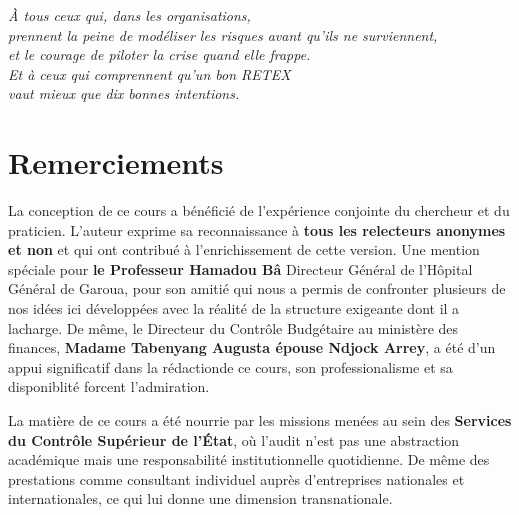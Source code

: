 \documentclass[12pt, a4paper, twoside, openright]{book}
\begin{document}
\clearpage\thispagestyle{empty}
\vspace*{3cm}
\begin{flushright}
    \begin{minipage}{0.62\textwidth}
        \itshape\large\color{CouleurPrimaire}
        À tous ceux qui, dans les organisations,\\
        prennent la peine de modéliser les risques avant qu'ils ne surviennent,\\
        et le courage de piloter la crise quand elle frappe.\\[1.5ex]
        \normalsize\normalfont\color{CouleurAccent}
        Et à ceux qui comprennent qu'un bon RETEX\\
        vaut mieux que dix bonnes intentions.
    \end{minipage}
\end{flushright}

\clearpage\thispagestyle{empty}
\chapter*{Remerciements}

La conception de ce cours a bénéficié de l'expérience conjointe du chercheur et du praticien. L'auteur exprime sa reconnaissance à \textbf{tous les relecteurs anonymes et non} et qui ont contribué à l'enrichissement de cette version. 
Une mention spéciale pour \textbf{le Professeur Hamadou Bâ} Directeur Général de l'Hôpital Général de Garoua, pour son amitié qui nous a permis de confronter  plusieurs de nos idées ici développées avec la réalité de la structure exigeante dont il a lacharge. De même, le Directeur du Contrôle Budgétaire au ministère des finances, \textbf{Madame Tabenyang Augusta épouse Ndjock Arrey}, a été d'un appui significatif dans la rédactionde ce cours, son professionalisme et sa disponiblité forcent l'admiration.

La matière de ce cours a été nourrie par les missions menées au sein des \textbf{Services du Contrôle Supérieur de l'État}, où l'audit n'est pas une abstraction académique mais une responsabilité institutionnelle quotidienne. De même des prestations comme consultant individuel auprès d'entreprises nationales et internationales, ce qui lui donne une dimension transnationale.
\end{document}
